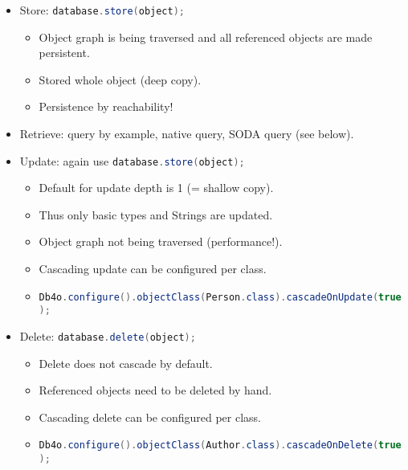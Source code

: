 \begin{breakbox}
\end{breakbox}

\begin{breakbox}
\begin{itemize}
	\item Store: \lstinline[language=Java]{database.store(object);}
		\begin{itemize}
			\item Object graph is being traversed and all referenced objects are made persistent.
			\item Stored whole object (deep copy).
			\item Persistence by reachability!
		\end{itemize}
	\item Retrieve: query by example, native query, SODA query (see below).
	\item Update: again use \lstinline[language=Java]{database.store(object);}
		\begin{itemize}
			\item Default for update depth is 1 (= shallow copy).
			\item Thus only basic types and Strings are updated.
			\item Object graph not being traversed (performance!).
			\item Cascading update can be configured per class.
			\item \lstinline[language=Java]{Db4o.configure().objectClass(Person.class).cascadeOnUpdate(true);}
		\end{itemize}
	\item Delete: \lstinline[language=Java]{database.delete(object);}
		\begin{itemize}
			\item Delete does not cascade by default.
			\item Referenced objects need to be deleted by hand.
			\item Cascading delete can be configured per class.
			\item \lstinline[language=Java]{Db4o.configure().objectClass(Author.class).cascadeOnDelete(true);}
		\end{itemize}
\end{itemize}
\end{breakbox}

\begin{breakbox}
\end{breakbox}

